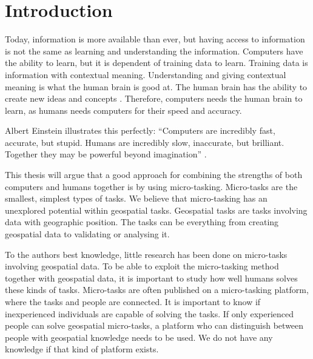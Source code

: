 \chapter{Introduction}
 Today, information is more available than ever, but having access to information is not the same as learning and understanding the information. Computers have the ability to learn, but it is dependent of training data to learn. Training data is information with contextual meaning. Understanding and giving contextual meaning is what the human brain is good at. The human brain has the ability to create new ideas and concepts \citep{Ross2016}. Therefore, computers needs the human brain to learn, as humans needs computers for their speed and accuracy.  

Albert Einstein illustrates this perfectly: “Computers are incredibly fast, accurate, but stupid. Humans are incredibly slow, inaccurate, but brilliant. Together they may be powerful beyond imagination” \citep{Holzinger2013}. 

This thesis will argue that a good approach for combining the strengths of both computers and humans together is by using micro-tasking. Micro-tasks are the smallest, simplest types of tasks. We believe that micro-tasking has an unexplored potential within geospatial tasks. Geospatial tasks are tasks involving data with geographic position. The tasks can be everything from creating geospatial data to validating or analysing it. 

To the authors best knowledge, little research has been done on micro-tasks involving geospatial data. To be able to exploit the micro-tasking method together with geospatial data, it is important to study how well humans solves these kinds of tasks. Micro-tasks are often published on a micro-tasking platform, where the tasks and people are connected. It is important to know if inexperienced individuals are capable of solving the tasks. If only experienced people can solve geospatial micro-tasks, a platform who can distinguish between people with geospatial knowledge needs to be used. We do not have any knowledge if that kind of platform exists. 

